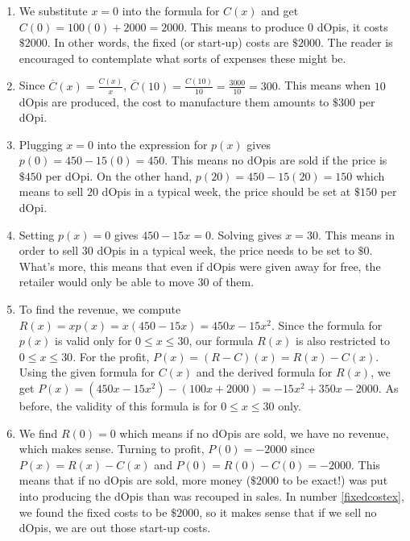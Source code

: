 {
\begin{enumerate}

\item \label{fixedcostex} We substitute $x=0$ into the formula for $C(x)$ and get $C(0) = 100(0) + 2000 = 2000$.  This means to produce $0$ dOpis, it costs $\$2000$.  In other words, the fixed (or start-up) costs are $\$2000$. The reader is encouraged to contemplate what sorts of expenses these might be.

\item  Since $\overline{C}(x) = \frac{C(x)}{x}$, $\overline{C}(10) = \frac{C(10)}{10} = \frac{3000}{10} = 300$.  This means when $10$ dOpis are produced, the cost to manufacture them amounts to $\$ 300$ per dOpi.

\item Plugging $x=0$ into the expression for $p(x)$ gives $p(0) = 450 - 15(0) = 450$.  This means no dOpis are sold if the price is  $\$450$ per dOpi.  On the other hand, $p(20) = 450-15(20) = 150$ which means to sell $20$ dOpis in a typical week, the price should be set at $\$150$ per dOpi.

\item  Setting $p(x) = 0$ gives $450-15x = 0$.  Solving gives $x = 30$.  This means in order to sell $30$ dOpis in a typical week, the price needs to be set to $\$ 0$. What's more, this means that even if dOpis were given away for free, the retailer would only be able to move $30$ of them.

\item  To find the revenue, we compute $R(x) = x p(x) = x (450 - 15x) = 450x - 15x^2$.  Since the formula for $p(x)$ is valid only for $0 \leq x \leq 30$, our formula $R(x)$ is also restricted to $0 \leq x \leq 30$.  For the profit, $P(x) = (R-C)(x) = R(x) - C(x)$.  Using the given formula for $C(x)$ and the derived formula for $R(x)$, we get $P(x) = \left(450x - 15x^2\right) -(100x+2000) = -15x^2+350x-2000$. As before, the validity of this formula is for $0 \leq x \leq 30$ only.

\item  We find $R(0) = 0$ which means if no dOpis are sold, we have no revenue, which makes sense.  Turning to profit, $P(0) = -2000$ since $P(x) = R(x) - C(x)$ and $P(0) = R(0) - C(0) = -2000$.  This means that if no dOpis are sold, more money ($\$2000$ to be exact!) was put into producing the dOpis than was recouped in sales. In number \ref{fixedcostex}, we found the fixed costs to be $\$2000$, so it makes sense that if we sell no dOpis, we are out those start-up costs. 


\end{enumerate}}
